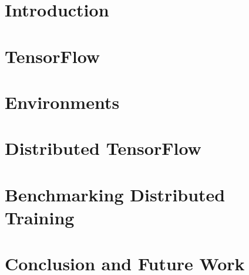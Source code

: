 \documentclass[12pt]{article}
\begin{document}
\section{Introduction}

\newpage

\section{TensorFlow}

\newpage

\section{Environments}

\newpage

\section{Distributed TensorFlow}

\newpage

\section{Benchmarking Distributed Training}

\newpage

\section{Conclusion and Future Work}

\newpage



\end{document}
